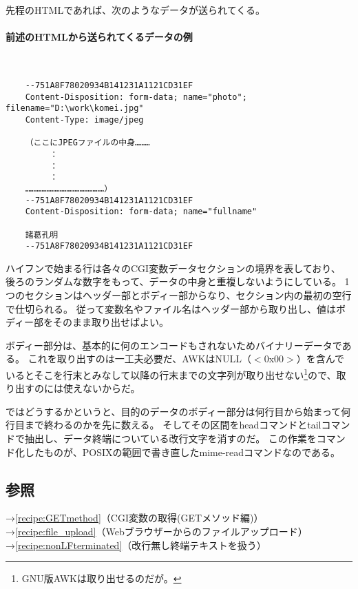 先程のHTMLであれば、次のようなデータが送られてくる。

\paragraph{前述のHTMLから送られてくるデータの例} 　\\
\begin{frameboxit}{160.0mm}
\begin{verbatim}
	--751A8F78020934B141231A1121CD31EF
	Content-Disposition: form-data; name="photo"; filename="D:\work\komei.jpg"
	Content-Type: image/jpeg

	（ここにJPEGファイルの中身………
	　　　：
	　　　：
	　　　：
	…………………………………………）
	--751A8F78020934B141231A1121CD31EF
	Content-Disposition: form-data; name="fullname"

	諸葛孔明
	--751A8F78020934B141231A1121CD31EF
\end{verbatim}
\end{frameboxit}

ハイフンで始まる行は各々のCGI変数データセクションの境界を表しており、
後ろのランダムな数字をもって、データの中身と重複しないようにしている。
1つのセクションはヘッダー部とボディー部からなり、セクション内の最初の空行で仕切られる。
従って変数名やファイル名はヘッダー部から取り出し、値はボディー部をそのまま取り出せばよい。

ボディー部分は、基本的に何のエンコードもされないためバイナリーデータである。
これを取り出すのは一工夫必要だ、AWKはNULL（$<$0x00$>$）を含んでいるとそこを行末とみなして以降の行末までの文字列が取り出せない\footnote{GNU版AWKは取り出せるのだが。}ので、取り出すのには使えないからだ。

ではどうするかというと、目的のデータのボディー部分は何行目から始まって何行目まで終わるのかを先に数える。
そしてその区間をheadコマンドとtailコマンドで抽出し、データ終端についている改行文字を消すのだ。
この作業をコマンド化したものが、POSIXの範囲で書き直したmime-readコマンドなのである。

\subsection*{参照}

\noindent
→\ref{recipe:GETmethod}（CGI変数の取得(GETメソッド編)） \\
→\ref{recipe:file_upload}（Webブラウザーからのファイルアップロード） \\
→\ref{recipe:nonLFterminated}（改行無し終端テキストを扱う）
